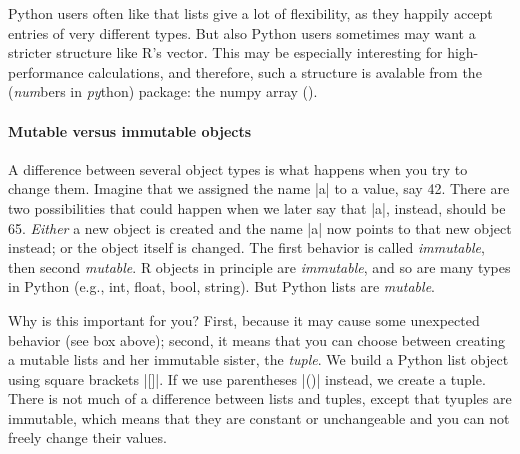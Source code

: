 
Python users often like that lists give  a lot of flexibility, as they happily accept
entries of very different types. But also Python users sometimes may want a stricter
structure like R's vector. This may be especially interesting for
high-performance calculations, and therefore, such a structure is
avalable from the  (\emph{num}bers in \emph{py}thon)
package: the numpy array ().




\paragraph{Mutable versus immutable objects}

A difference between several object types is what happens when you try to change them.
Imagine that we assigned the name |a| to a value, say 42.
There are two possibilities that could happen when we later say that |a|,
instead, should be 65. \emph{Either} a new object is created and the name |a|
now points to that new object instead; or the object itself is changed.
The first behavior is called \emph{immutable}, then second \emph{mutable}.
R objects in principle are \emph{immutable}, and so are many types
in Python (e.g., int, float, bool, string). But Python lists are \emph{mutable}.




Why is this important for you? First, because it may cause some
unexpected behavior (see box above); second, it means that you can
choose between creating a mutable lists and her immutable sister, the \emph{tuple}.
We build a Python list object using square brackets |[]|. If we use
parentheses |()| instead, we create a tuple.
There is not much of a difference between lists and tuples, except that tyuples are immutable, which means that
they are constant or unchangeable and you can not freely change their
values.

